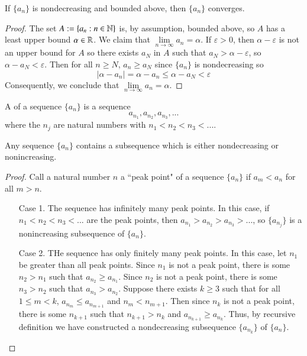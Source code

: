 \documentclass[12pt, a4paper, oneside, openright, titlepage]{book}
\begin{document}
\begin{thm}
    If $\{a_n\}$ is nondecreasing and bounded above, then $\{a_n\}$ converges.
\end{thm}
\begin{proof}
    The set $A := \{a_n:n\in\mathbb N\}$ is, by assumption, bounded above, so $A$ has a least upper bound $\alpha \in \mathbb R$. We claim that $\lim\limits_{n\rightarrow \infty}a_n = \alpha$. If $\varepsilon > 0$, then $\alpha - \varepsilon$ is not an upper bound for $A$ so there exists $a_N$ in $A$ such that $a_N > \alpha - \varepsilon$, so $\alpha - a_N < \varepsilon$. Then for all $n \geq N$, $a_n \geq a_N$ since $\{a_n\}$ is nondecreasing so \begin{equation*}
        |\alpha - a_n| = \alpha - a_n \leq \alpha - a_N < \varepsilon
    \end{equation*}
    Consequently, we conclude that $\lim\limits_{n\rightarrow \infty}a_n = \alpha$.
\end{proof}


\begin{defn}
    A  of a sequence $\{a_n\}$ is a sequence \begin{equation*}
        a_{n_1},a_{n_2},a_{n_3},...
    \end{equation*}
    where the $n_j$ are natural numbers with $n_1 < n_2 < n_3 < ...$.
\end{defn}

\begin{lem}
    Any sequence $\{a_n\}$ contains a subsequence which is either nondecreasing or nonincreasing.
\end{lem}
\begin{proof}
    Call a natural number $n$ a ``peak point" of a sequence $\{a_n\}$ if $a_m < a_n$ for all $m > n$.\begin{itemize}[leftmargin=+1in]
        \item[Case 1.] The sequence has infinitely many peak points. In this case, if $n_1 < n_2 < n_3 < ...$ are the peak points, then $a_{n_1} > a_{n_2} > a_{n_3} > ...$, so $\{a_{n_j}\}$ is a nonincreasing subsequence of $\{a_n\}$.
        \item[Case 2.] THe sequence has only finitely many peak points. In this case, let $n_1$ be greater than all peak points. Since $n_1$ is not a peak point, there is some $n_2 > n_1$ such that $a_{n_2} \geq a_{n_1}$. Since $n_2$ is not a peak point, there is some $n_3 > n_2$ such that $a_{n_3} > a_{n_2}$. Suppose there exists $k \geq 3$ such that for all $1 \leq m < k$, $a_{n_m} \leq a_{n_{m+1}}$ and $n_m < n_{m+1}$. Then since $n_k$ is not a peak point, there is some $n_{k+1}$ such that $n_{k+1} > n_k$ and $a_{n_{k+1}} \geq a_{n_k}$. Thus, by recursive definition we have constructed a nondecreasing subsequence $\{a_{n_k}\}$ of $\{a_n\}$.
    \end{itemize}
\end{proof}
\end{document}
